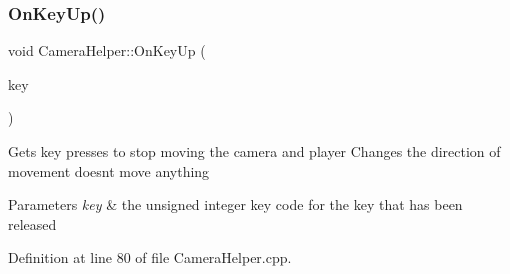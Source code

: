 \subsubsection{\texorpdfstring{On\+Key\+Up()}{OnKeyUp()}}
{\footnotesize\ttfamily void Camera\+Helper\+::\+On\+Key\+Up (\begin{DoxyParamCaption}\item[{U\+I\+NT}]{key }\end{DoxyParamCaption})}

Gets key presses to stop moving the camera and player Changes the direction of movement doesn\textquotesingle{}t move anything 
\begin{DoxyParams}{Parameters}
{\em key} & the unsigned integer key code for the key that has been released \\
\hline
\end{DoxyParams}


Definition at line 80 of file Camera\+Helper.\+cpp.


